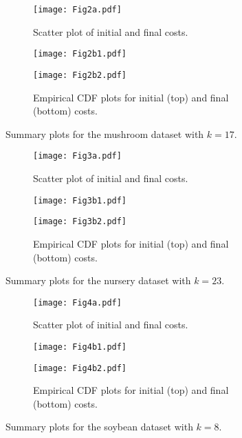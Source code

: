 \begin{figure}
    \begin{subfigure}{.5\textwidth}
        \texttt{[image: Fig2a.pdf]}
        \caption{Scatter plot of initial and final costs.}
    \end{subfigure}
    \hfill%
    \begin{subfigure}{.5\textwidth}
        \texttt{[image: Fig2b1.pdf]}

        \texttt{[image: Fig2b2.pdf]}
        \caption{Empirical CDF plots for initial (top) and final (bottom)
                 costs.}
    \end{subfigure}
    \caption{Summary plots for the mushroom dataset with \(k=17\).}%
    \label{fig:mushroom_knee}
\end{figure}

\begin{figure}
    \begin{subfigure}{.5\textwidth}
        \texttt{[image: Fig3a.pdf]}
        \caption{Scatter plot of initial and final costs.}
    \end{subfigure}
    \hfill%
    \begin{subfigure}{.5\textwidth}
        \texttt{[image: Fig3b1.pdf]}

        \texttt{[image: Fig3b2.pdf]}
        \caption{Empirical CDF plots for initial (top) and final (bottom)
                 costs.}
    \end{subfigure}
    \caption{Summary plots for the nursery dataset with \(k=23\).}%
    \label{fig:nursery_knee}
\end{figure}

\begin{figure}
    \begin{subfigure}{.5\textwidth}
        \texttt{[image: Fig4a.pdf]}
        \caption{Scatter plot of initial and final costs.}
    \end{subfigure}
    \hfill%
    \begin{subfigure}{.5\textwidth}
        \texttt{[image: Fig4b1.pdf]}

        \texttt{[image: Fig4b2.pdf]}
        \caption{Empirical CDF plots for initial (top) and final (bottom)
                 costs.}
    \end{subfigure}
    \caption{Summary plots for the soybean dataset with \(k=8\).}%
    \label{fig:soybean_knee}
\end{figure}



